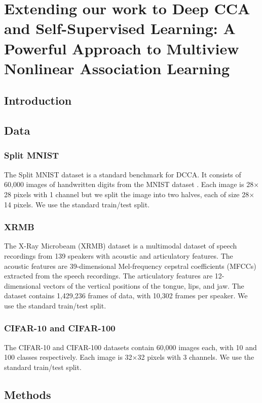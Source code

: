\chapter{Extending our work to Deep CCA and Self-Supervised Learning: A Powerful Approach to Multiview Nonlinear Association Learning}

\section{Introduction}

\section{Data}

\subsection{Split MNIST}
The Split MNIST dataset \cite{wang2015stochastic} is a standard benchmark for DCCA. It consists of 60,000 images of handwritten digits from the MNIST dataset \cite{lecun1998gradient}. Each image is 28$\times$28 pixels with 1 channel but we split the image into two halves, each of size 28$\times$14 pixels. We use the standard train/test split.

\subsection{XRMB}
The X-Ray Microbeam (XRMB) dataset \cite{westbury1994x} is a multimodal dataset of speech recordings from 139 speakers with acoustic and articulatory features. The acoustic features are 39-dimensional Mel-frequency cepstral coefficients (MFCCs) extracted from the speech recordings. The articulatory features are 12-dimensional vectors of the vertical positions of the tongue, lips, and jaw. The dataset contains 1,429,236 frames of data, with 10,302 frames per speaker. We use the standard train/test split.

\subsection{CIFAR-10 and CIFAR-100}
The CIFAR-10 and CIFAR-100 datasets contain 60,000 images each, with 10 and 100 classes respectively. Each image is 32$\times$32 pixels with 3 channels. We use the standard train/test split.


\section{Methods}


